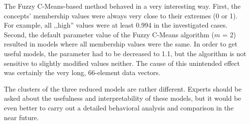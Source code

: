 \documentclass[graybox]{svmult}
\begin{document}
The Fuzzy C-Means-based method behaved in a very interesting way. 
First, the concepts' membership values were always very close to their 
extremes (0 or 1). For example, all ,,high'' values were at least 0.994 
in the investigated cases. Second, the default parameter value of the 
Fuzzy C-Means algorithm ($m$ = 2) resulted in models where all 
membership values were the same. In order to get useful models, the 
parameter had to be decreased to 1.1, but the algorithm is not sensitive 
to slightly modified values neither. The cause of this unintended 
effect was certainly the very long, 66-element data vectors.

The clusters of the three reduced models are rather different. Experts 
should be asked about the usefulness and interpretability of these 
models, but it would be even better to carry out a detailed behavioral 
analysis and comparison in the near future. 
\end{document}
